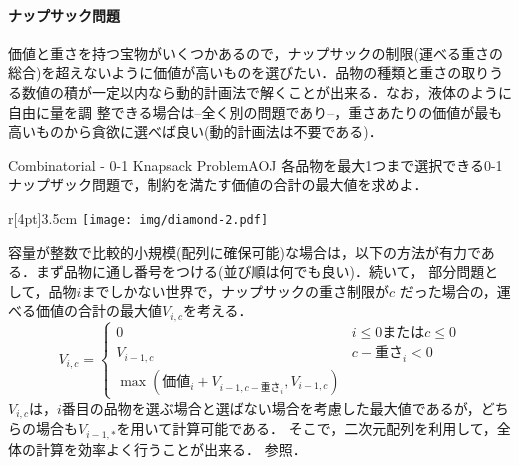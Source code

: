 \paragraph{ナップサック問題}

価値と重さを持つ宝物がいくつかあるので，ナップサックの制限(運べる重さの
総合)を超えないように価値が高いものを選びたい．品物の種類と重さの取りうる数値の積が一定以内なら動的計画法で解くことが出来る．なお，液体のように自由に量を調
整できる場合は--全く別の問題であり--，重さあたりの価値が最も高いものから貪欲に選べば良い(動的計画法は不要である)．

\begin{pbox}{Combinatorial - 0-1 Knapsack Problem}{AOJ}
各品物を最大1つまで選択できる0-1ナップザック問題で，制約を満たす価値の合計の最大値を求めよ．

\end{pbox}

\begin{wrapfigure}[4]{r}[4pt]{3.5cm}
\texttt{[image: img/diamond-2.pdf]}
\end{wrapfigure}

容量が整数で比較的小規模(配列に確保可能)な場合は，以下の方法が有力であ
る．まず品物に通し番号をつける(並び順は何でも良い)．続いて，
部分問題として，品物$i$までしかない世界で，ナップサックの重さ制限が$c$
だった場合の，運べる価値の合計の最大値$V_{i,c}$を考える．
\begin{equation*}
    V_{i,c} = \left\{
  \begin{array}{ll}
    0 & i \le 0 \mbox{または} c \le 0\\
    V_{i-1,c} & c-\mbox{重さ}_i < 0 \\
    \max(\mbox{価値}_i + V_{i-1,c-\mbox{重さ}_i}, V_{i-1,c})
  \end{array}\right.
\end{equation*}
$V_{i,c}$は，$i$番目の品物を選ぶ場合と選ばない場合を考慮した最大値であるが，どちらの場合も$V_{i-1,*}$を用いて計算可能である．
そこで，二次元配列を利用して，全体の計算を効率よく行うことが出来る．
\pcaojbook[pp.~416--]参照．

\begin{center}
\end{center}

